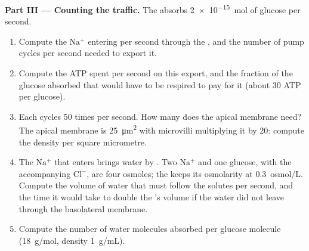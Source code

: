 \begin{problem}
\medskip
\noindent\textbf{Part III --- Counting the traffic.}
The  absorbs \qty{2e-15}{mol} of glucose per second.
\begin{enumerate}[resume]
  \item Compute the $\mathrm{Na^+}$ entering per second through the
        , and the number of pump cycles per second needed to
        export it.
  \item Compute the ATP spent per second on this export, and the
        fraction of the glucose absorbed that would have to be
        respired to pay for it (about 30 ATP per glucose).
  \item Each  cycles \qty{50}{} times per second. How many
         does the apical membrane need? The apical membrane
        is \qty{25}{\micro m^2} with microvilli multiplying it by
        \qty{20}{}: compute the  density per square
        micrometre.
  \item The $\mathrm{Na^+}$ that enters brings water by . Two
        $\mathrm{Na^+}$ and one glucose, with the accompanying
        $\mathrm{Cl^-}$, are four osmoles; the  keeps its
        osmolarity at \qty{0.3}{osmol/L}. Compute the volume of water
        that must follow the solutes per second, and the time it would
        take to double the 's volume if the water did not leave
        through the basolateral membrane.
  \item Compute the number of water molecules absorbed per glucose
        molecule (\qty{18}{g/mol}, density \qty{1}{g/mL}).
\end{enumerate}


\end{problem}
